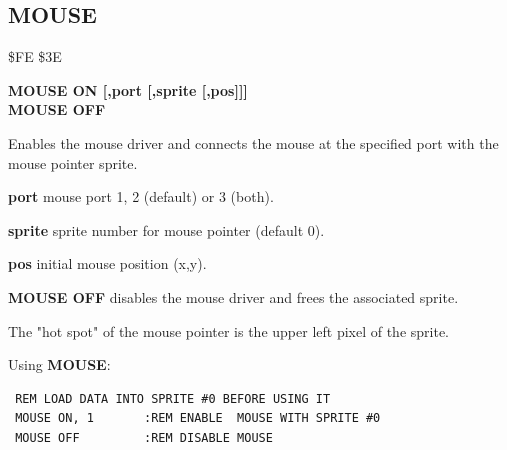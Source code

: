 
\newpage
\subsection{MOUSE}
\begin{description}[leftmargin=2cm,style=nextline]
\item [Token:] \$FE \$3E
\item [Format:] {\bf MOUSE ON [,port [,sprite [,pos]]]} \\
                {\bf MOUSE OFF}
\item [Usage:]  Enables the mouse driver
                and connects the mouse at the specified port
                with the mouse pointer sprite.

                {\bf port} mouse port 1, 2 (default) or 3 (both).

                {\bf sprite} sprite number for mouse pointer (default 0).

                {\bf pos} initial mouse position (x,y).

                {\bf MOUSE OFF} disables the mouse
                driver and frees the associated sprite.

\item [Remarks:] The "hot spot" of the mouse pointer is the upper left
                pixel of the sprite.

\item [Examples:] Using {\bf MOUSE}:
\begin{tcolorbox}[colback=black,coltext=white]
\verbatimfont{\codefont}
\begin{verbatim}
 REM LOAD DATA INTO SPRITE #0 BEFORE USING IT
 MOUSE ON, 1       :REM ENABLE  MOUSE WITH SPRITE #0
 MOUSE OFF         :REM DISABLE MOUSE
\end{verbatim}
\end{tcolorbox}
\end{description}


\newpage
